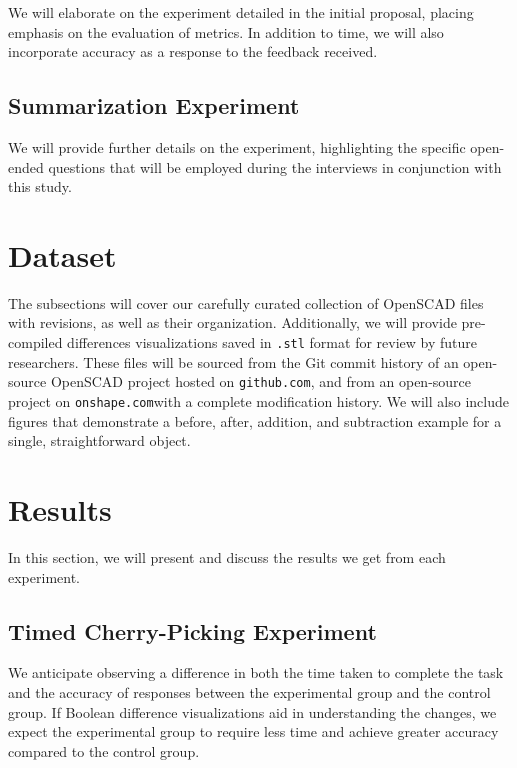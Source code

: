 \documentclass[sigconf,authorversion,nonacm]{acmart}
\begin{document}
We will elaborate on the experiment detailed in the initial proposal, placing emphasis on the evaluation of metrics. In addition to time, we will also incorporate accuracy as a response to the feedback received.

\subsection{Summarization Experiment}

We will provide further details on the experiment, highlighting the specific open-ended questions that will be employed during the interviews in conjunction with this study.

\section{Dataset}

The subsections will cover our carefully curated collection of OpenSCAD files with revisions, as well as their organization. Additionally, we will provide pre-compiled differences visualizations saved in \texttt{.stl} format for review by future researchers. These files will be sourced from the Git commit history of an open-source OpenSCAD project hosted on \texttt{github.com}, and from an open-source project on \texttt{onshape.com}with a complete modification history.
We will also include figures that demonstrate a before, after, addition, and subtraction example for a single, straightforward object.

\section{Results}

In this section, we will present and discuss the results we get from each experiment.
\subsection{Timed Cherry-Picking Experiment}
We anticipate observing a difference in both the time taken to complete the task and the accuracy of responses between the experimental group and the control group. If Boolean difference visualizations aid in understanding the changes, we expect the experimental group to require less time and achieve greater accuracy compared to the control group.
\end{document}
